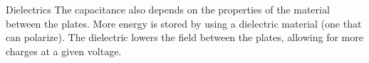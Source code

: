 \documentclass[aspectratio=169,
hyperref={colorlinks,urlcolor=blue}
]{beamer}
\begin{document}
{{\begin{center}
\end{center}
\begin{block}{Dielectrics}
The capacitance also depends on the properties of the material between the plates. More energy is stored by using
a dielectric material (one that can polarize). The dielectric lowers the field between the plates, allowing for more
charges at a given voltage. 
\end{block}
}

}





\end{document}
